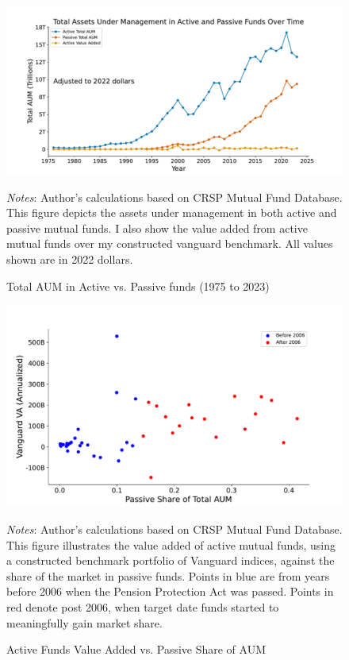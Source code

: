 \documentclass[12pt]{article}
\begin{document}
\begin{figure}[htbp]{}
    \centering
    \caption{Total AUM in Active vs. Passive funds (1975 to 2023)}
    \includegraphics[width=\textwidth]{figures/active_passive_aum.pdf}
    \begin{spacing}{1}
{\parbox{.95\linewidth}{
	\scriptsize{\scriptsize{{\emph{Notes}: Author's calculations based on CRSP Mutual Fund Database. This figure depicts the assets under management in both active and passive mutual funds. I also show the value added from active mutual funds over my constructed vanguard benchmark. All values shown are in 2022 dollars. }}}}}
\end{spacing}
    \label{fig:active_passive}
\end{figure}
\begin{figure}[H]{}
    \centering
    \caption{Active Funds Value Added vs. Passive Share of AUM}
    \includegraphics[width=\textwidth]{figures/active_passive_share_vanguard_va_pre_post.pdf}
    \begin{spacing}{1}
{\parbox{.95\linewidth}{
	\scriptsize{\scriptsize{{\emph{Notes}: Author's calculations based on CRSP Mutual Fund Database. This figure illustrates the value added of active mutual funds, using a constructed benchmark portfolio of Vanguard indices, against the share of the market in passive funds. Points in blue are from years before 2006 when the Pension Protection Act was passed. Points in red denote post 2006, when target date funds started to meaningfully gain market share. }}}}}
    \end{spacing}
    \label{fig:passive_share}
\end{figure}
\end{document}
